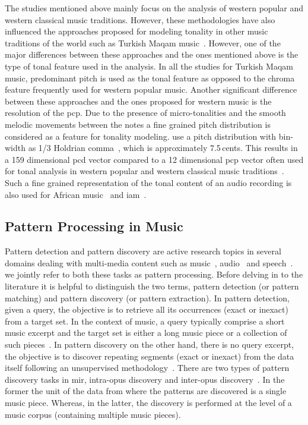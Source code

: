 The studies mentioned above mainly focus on the analysis of western popular and western classical music traditions. However, these methodologies have also influenced the approaches proposed for modeling tonality in other music traditions of the world such as Turkish Maqam music~\cite{gedik2010pitch,gedik2009evaluation,bozkurt2008automatic}. However, one of the major differences between these approaches and the ones mentioned above is the type of tonal feature used in the analysis. In all the studies for Turkish Maqam music, predominant pitch is used as the tonal feature as opposed to the chroma feature frequently used for western popular music. Another significant difference between these approaches and the ones proposed for western music is the resolution of the \gls{pcp}. Due to the presence of micro-tonalities and the smooth melodic movements between the notes a fine grained pitch distribution is considered as a feature for tonality modeling. \cite{bozkurt2008automatic,gedik2010pitch} use a pitch distribution with bin-width as 1/3 Holdrian comma~\cite{akkocc2002non}, which is approximately 7.5\,cents. This results in a 159 dimensional \gls{pcd} vector compared to a 12 dimensional \gls{pcp} vector often used for tonal analysis in western popular and western classical music traditions~\cite{gomez2006tonal}. Such a fine grained representation of the tonal content of an audio recording is also used for African music~\citep{moelants2009exploring} and \acrfull{iam}~\citep{chordia2013joint}. 

\subsection{Pattern Processing in Music}
\label{sec:pattern_processin_in_music}

Pattern detection and pattern discovery are active research topics in several domains dealing with multi-media content such as music~\citep{klapuri2010pattern}, audio~\citep{Herley2006} and speech~\citep{Park2008}. we jointly refer to both these tasks as pattern processing. Before delving in to the literature it is helpful to distinguish the two terms, pattern detection (or pattern matching) and pattern discovery (or pattern extraction). In pattern detection, given a query, the objective is to retrieve all its occurrences (exact or inexact) from a target set. In the context of music, a query typically comprise a short music excerpt and the target set is either a long music piece or a collection of such pieces~\citep{ghias1995query}. In pattern discovery on the other hand, there is no query excerpt, the objective is to discover repeating segments (exact or inexact) from the data itself following an unsupervised methodology~\citep{dannenberg2003pattern}. There are two types of pattern discovery tasks in \gls{mir}, intra-opus discovery and inter-opus discovery~\citep{conklin2001representation}. In the former the unit of the data from where the patterns are discovered is a single music piece. Whereas, in the latter, the discovery is performed at the level of a music corpus (containing multiple music pieces).

